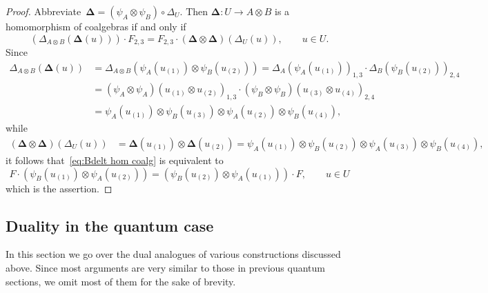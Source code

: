 \documentclass[12pt, reqno]{amsart}
\theoremstyle{definition}
\numberwithin{equation}{section}
\newcommand{\tensor}{\otimes}
\begin{document}
\begin{proof}
Abbreviate~$\boldsymbol{\Delta}=(\psi_A\tensor\psi_B)\circ\Delta_U$. Then $\boldsymbol{\Delta}:U\to A\tensor B$ is
a homomorphism of coalgebras if and only if 
\begin{equation}\label{eq:Bdelt hom coalg}
(\Delta_{A\tensor B}(\boldsymbol{\Delta}(u)))\cdot F_{2,3}=F_{2,3}\cdot (\boldsymbol{\Delta}\tensor\boldsymbol{\Delta})(\Delta_U(u)),\qquad u\in U.
\end{equation}
Since
\begin{align*}
\Delta_{A\tensor B}(\boldsymbol{\Delta}(u))&=
\Delta_{A\tensor B}(\psi_A(u_{(1)})\tensor \psi_B(u_{(2)}))=
\Delta_A(\psi_A(u_{(1)}))_{1,3}\cdot 
\Delta_B(\psi_B(u_{(2)}))_{2,4}\\
&=(\psi_A\tensor\psi_A)(u_{(1)}\tensor u_{(2)})_{1,3}
\cdot(\psi_B\tensor\psi_B)(u_{(3)}\tensor u_{(4)})_{2,4}\\
&=\psi_A(u_{(1)})\tensor\psi_B(u_{(3)})\tensor \psi_A(u_{(2)})\tensor\psi_B(u_{(4)}),
\end{align*}
while
\begin{align*}
  (\boldsymbol{\Delta}\tensor\boldsymbol{\Delta})(\Delta_U(u))&=\boldsymbol{\Delta}(u_{(1)})\tensor 
  \boldsymbol{\Delta}(u_{(2)})
  =
  \psi_A(u_{(1)})\tensor \psi_B(u_{(2)})\tensor \psi_A(u_{(3)})\tensor \psi_B(u_{(4)}),
\end{align*}
it follows that~\eqref{eq:Bdelt hom coalg} is equivalent to
$$
F\cdot (\psi_B(u_{(1)})\tensor \psi_A(u_{(2)}))=
(\psi_B(u_{(2)})\tensor \psi_A(u_{(1)}))\cdot F,\qquad u\in U
$$
which is the assertion.
\end{proof}

\subsection{Duality in the quantum case}\label{subs:quant dual}
In this section we go over the dual analogues 
of various constructions discussed above. Since most 
arguments are very similar to those in previous
quantum sections, we omit most of them for the sake of brevity.
\end{document}
